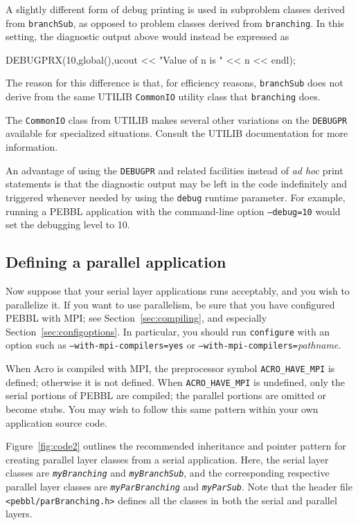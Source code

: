 A slightly different form of debug printing is used in subproblem
classes derived from \texttt{branchSub}, as opposed to problem classes
derived from \texttt{branching}.  In this setting, the diagnostic
output above would instead be expressed as
\begin{codeblock}
DEBUGPRX(10,global(),ucout << "Value of n is " << n << endl);
\end{codeblock}
The reason for this difference is that, for efficiency reasons,
\texttt{branchSub} does not derive from the same UTILIB
\texttt{CommonIO} utility class that \texttt{branching} does.  

The \texttt{CommonIO} class from UTILIB makes several other variations
on the \texttt{DEBUGPR} available for specialized situations.  Consult
the UTILIB documentation for more information.

An advantage of using the \texttt{DEBUGPR} and related facilities
instead of \emph{ad hoc} print statements is that the diagnostic
output may be left in the code indefinitely and triggered whenever
needed by using the \texttt{debug} runtime parameter.  For example,
running a PEBBL application with the command-line option
\texttt{--debug=10} would set the debugging level to 10.  

\subsection{Defining a parallel application}
\label{sec:parMethods}
Now suppose that your serial layer applications runs acceptably, and
you wish to parallelize it.  If you want to use parallelism, be sure
that you have configured PEBBL with MPI; see Section~\ref{sec:compiling}, and
especially Section~\ref{sec:configoptions}.  In particular, you should
run \texttt{configure} with an option such as
\texttt{--with-mpi-compilers=yes} or
\texttt{--with-mpi-compilers=}\emph{pathname}.

When Acro is compiled with MPI, the preprocessor symbol
\texttt{ACRO\_HAVE\_MPI} is defined; otherwise it is not defined.
When \texttt{ACRO\_HAVE\_MPI} is undefined, only the serial portions
of PEBBL are compiled; the parallel portions are omitted or become
stubs.  You may wish to follow this same pattern within your own
application source code.

Figure~\ref{fig:code2} outlines the
recommended inheritance and pointer pattern for creating parallel
layer classes from a serial application.  Here, the serial layer
classes are \texttt{\emph{myBranching}} and
\texttt{\emph{myBranchSub}}, and the corresponding 
respective parallel layer classes
are \texttt{\emph{myParBranching}} and \texttt{\emph{myParSub}}.  Note
that the header file \texttt{<pebbl/parBranching.h>} defines all the
classes in both the serial and parallel layers.  

